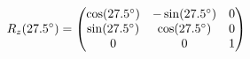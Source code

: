 \documentclass[preview]{standalone}
\begin{document}
\begin{align*}
\special{dvisvgm:raw <g id='unique000'>}R_z(27.5^\circ) = \begin{pmatrix} \cos(27.5^\circ) & -\sin(27.5^\circ) & 0 \\ \sin(27.5^\circ) & \cos(27.5^\circ) & 0 \\ 0 & 0 & 1 \end{pmatrix}\special{dvisvgm:raw </g>}
\end{align*}
\end{document}
